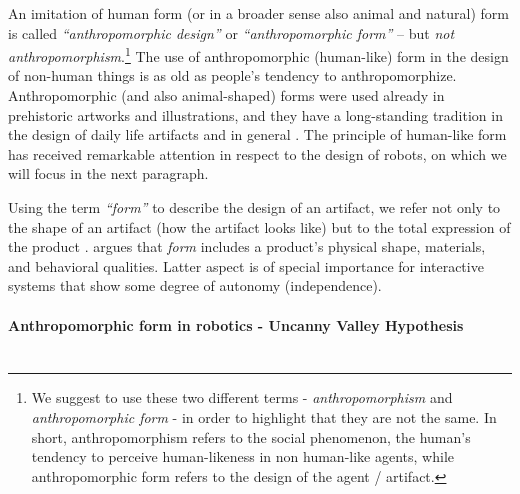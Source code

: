 \documentclass{frontiersSCNS} %
\begin{document}
An imitation of human form (or in a broader sense also animal and natural) form is called \textit{``anthropomorphic design''} or \textit{``anthropomorphic form''} -- but \textit{not anthropomorphism}.\footnote{We suggest to use these two different terms - \textit{anthropomorphism} and \textit{anthropomorphic form} - in order to highlight that they are not the same. In short, anthropomorphism refers to the social phenomenon, the human's tendency to perceive human-likeness in non human-like agents, while anthropomorphic form refers to the design of the agent / artifact.} The use of anthropomorphic (human-like) form in the design of non-human things is as old as people's tendency to anthropomorphize. Anthropomorphic (and also animal-shaped) forms were used already in prehistoric artworks and illustrations, and they have a long-standing tradition in the design of daily life artifacts and in general \citep{guthrie_bottles_2000}. The principle of human-like form has received remarkable attention in respect to the design of robots, on which we will focus in the next paragraph.

Using the term \textit{``form''} to describe the design of an artifact, we refer not only to the shape of an artifact (how the artifact looks like) but to the total expression of the product \citep{bartneck_shaping_2004}. \cite{disalvo_hug:_2003} argues that \textit{form} includes a product's physical shape, materials, and behavioral qualities. Latter aspect is of special importance for interactive systems that show some degree of autonomy (independence).


\paragraph*{Anthropomorphic form in robotics - Uncanny Valley Hypothesis\\ \\}
\end{document}

